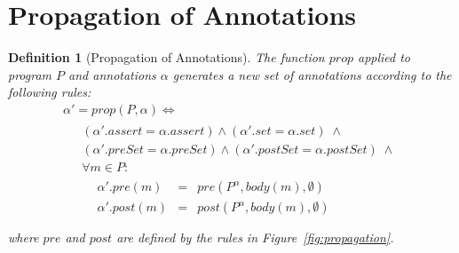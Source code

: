 \documentclass[10pt,notitlepage,twoside]{article}
\newcommand{\pre}{\mathit{pre}}
\newcommand{\post}{\mathit{post}}
\newtheorem{definition}{Definition}
\begin{document}
\section{Propagation of Annotations}


\begin{definition}[Propagation of Annotations]
The function $\mathit{prop}$ applied to program $P$ and annotations $\alpha$ generates a new set of annotations according to the following rules:
\begin{displaymath}
\begin{array}{l}
\alpha' = \mathit{prop}(P,\alpha) \Leftrightarrow \\
\;\;\;\;
\begin{array}{l}
(\alpha'.\mathit{assert} = \alpha.\mathit{assert}) \wedge (\alpha'.\mathit{set} = \alpha.\mathit{set}) \;\wedge \\
(\alpha'.\mathit{preSet} = \alpha.\mathit{preSet}) \wedge (\alpha'.\mathit{postSet} = \alpha.\mathit{postSet}) \;\wedge \\
\forall m \in P:\\
\;\;\;\begin{array}{rcl}
\alpha'.\pre(m) & = & \pre(P^\alpha,\mathit{body}(m),\emptyset) \\
\alpha'.\post(m) & = & \post(P^\alpha,\mathit{body}(m),\emptyset) \\
\end{array}
\end{array}
\end{array}
\end{displaymath}
where $\pre$ and $\post$ are defined by the rules in Figure~\ref{fig:propagation}.
\end{definition}
\end{document}
